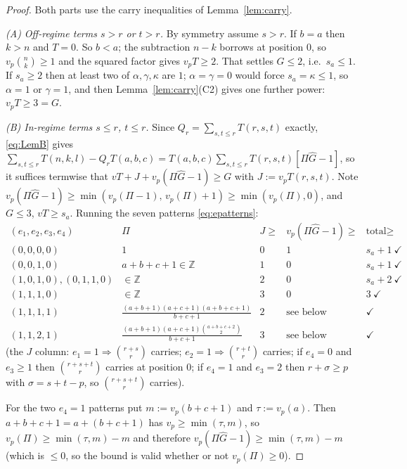 \documentclass[11pt,reqno]{amsart}
\theoremstyle{plain}
\theoremstyle{definition}
\theoremstyle{remark}
\numberwithin{equation}{section}
\newcommand{\ZZ}{\mathbb{Z}}
\begin{document}
\begin{proof}
Both parts use the carry inequalities of Lemma~\ref{lem:carry}.

\emph{(A) Off-regime terms $s>r$ or $t>r$.} By symmetry assume $s>r$. If $b=a$ then $k>n$ and
$T=0$. So $b<a$; the subtraction $n-k$ borrows at position $0$, so $v_p\binom nk\ge1$ and the
squared factor gives $v_pT\ge2$. That settles $G\le2$, i.e.\ $s_a\le1$. If $s_a\ge2$ then at
least two of $\alpha,\gamma,\kappa$ are $1$; $\alpha=\gamma=0$ would force $s_a=\kappa\le1$, so
$\alpha=1$ or $\gamma=1$, and then Lemma~\ref{lem:carry}(C2) gives one further power: $v_pT\ge3=G$.

\emph{(B) In-regime terms $s\le r$, $t\le r$.} Since $Q_r=\sum_{s,t\le r}T(r,s,t)$ exactly,
\eqref{eq:LemB} gives
$\sum_{s,t\le r}T(n,k,l)-Q_rT(a,b,c)=T(a,b,c)\sum_{s,t\le r}T(r,s,t)[\Pi\hat G-1]$, so it
suffices termwise that $vT+J+v_p(\Pi\hat G-1)\ge G$ with $J:=v_pT(r,s,t)$. Note
$v_p(\Pi\hat G-1)\ge\min(v_p(\Pi-1),\,v_p(\Pi)+1)\ge\min(v_p(\Pi),0)$, and $G\le3$,
$vT\ge s_a$. Running the seven patterns \eqref{eq:epatterns}:
\[
\begin{array}{lcccl}
(e_1,e_2,e_3,e_4) & \Pi & J\ge & v_p(\Pi\hat G-1)\ge & \text{total}\ge\\\hline
(0,0,0,0) & 1 & 0 & 1 & s_a+1\ \checkmark\\
(0,0,1,0) & a{+}b{+}c{+}1\in\ZZ & 1 & 0 & s_a+1\ \checkmark\\
(1,0,1,0),(0,1,1,0) & \in\ZZ & 2 & 0 & s_a+2\ \checkmark\\
(1,1,1,0) & \in\ZZ & 3 & 0 & 3\ \checkmark\\
(1,1,1,1) & \frac{(a+b+1)(a+c+1)(a+b+c+1)}{b+c+1} & 2 & \text{see below} & \checkmark\\
(1,1,2,1) & \frac{(a+b+1)(a+c+1)\binom{a+b+c+2}{2}}{b+c+1} & 3 & \text{see below} & \checkmark
\end{array}
\]
(the $J$ column: $e_1=1\Rightarrow\binom{r+s}{r}$ carries; $e_2=1\Rightarrow\binom{r+t}{r}$
carries; if $e_4=0$ and $e_3\ge1$ then $\binom{r+s+t}{r}$ carries at position $0$; if $e_4=1$
and $e_3=2$ then $r+\sigma\ge p$ with $\sigma=s+t-p$, so $\binom{r+s+t}{r}$ carries).

For the two $e_4=1$ patterns put $m:=v_p(b+c+1)$ and $\tau:=v_p(a)$. Then $a+b+c+1=a+(b+c+1)$
has $v_p\ge\min(\tau,m)$, so $v_p(\Pi)\ge\min(\tau,m)-m$ and therefore
$v_p(\Pi\hat G-1)\ge\min(\tau,m)-m$ (which is $\le0$, so the bound is valid whether or not
$v_p(\Pi)\ge0$).


\end{proof}
\end{document}
